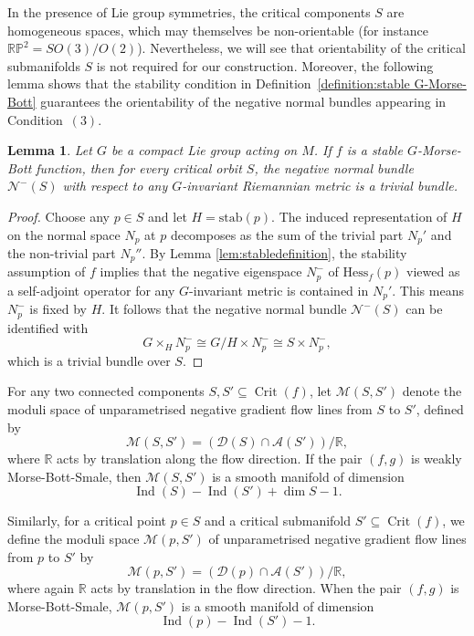 \documentclass[11pt]{amsart}
\newtheorem{lemma}[theorem]{Lemma}
\theoremstyle{definition}
\numberwithin{equation}{subsection}
\newcommand{\R}{\mathbb{R}}
\DeclareMathOperator{\ind}{Ind}
\DeclareMathOperator{\crit}{Crit}
\begin{document}
In the presence of Lie group symmetries, the critical components $S$ are homogeneous spaces, which may themselves be non-orientable (for instance $\mathbb{RP}^2 = SO(3)/O(2)$).
Nevertheless, we will see that orientability of the critical submanifolds $S$ is not required for our construction.
Moreover, the following lemma shows that the stability condition in Definition~\ref{definition:stable G-Morse-Bott} guarantees the orientability of the negative normal bundles appearing in Condition~$(3)$.

\begin{lemma}\label{lem:orientable}
Let $G$ be a compact Lie group acting on $M$.
If $f$ is a stable $G$-Morse-Bott function, then for every critical orbit $S$, the negative normal bundle $\mathcal{N}^-(S)$ with respect to any $G$-invariant Riemannian metric is a trivial bundle.
\end{lemma}

\begin{proof}
    Choose any $p\in S$ and let $H=\text{stab}(p)$. The induced representation of $H$ on the normal space $N_p$ at $p$ decomposes as the sum of the trivial part $N_p'$ and the non-trivial part $N_p''$. By Lemma \ref{lem:stabledefinition}, the stability assumption of $f$ implies that the negative eigenspace $N_p^-$ of $\text{Hess}_f(p)$ viewed as a self-adjoint operator for any $G$-invariant metric is contained in $N_p'$. This means $N_p^-$ is fixed by $H$. It follows that the negative normal bundle $\mathcal{N}^-(S)$ can be identified with \[G\times_H N_p^-\cong G/H\times N_p^-\cong S\times N_p^-,\] which is a trivial bundle over $S$.
\end{proof}



For any two connected components $S,S'\subseteq\crit(f)$, let $\mathcal{M}(S,S')$ denote the moduli space of unparametrised negative gradient flow lines from $S$ to $S'$, defined by
\[
\mathcal{M}(S,S') = (\mathscr{D}(S)\cap \mathscr{A}(S'))/\R,
\]
where $\R$ acts by translation along the flow direction.
If the pair $(f,g)$ is weakly Morse-Bott-Smale, then $\mathcal{M}(S,S')$ is a smooth manifold of dimension
\[
\ind(S)-\ind(S')+\dim S-1.
\]

Similarly, for a critical point $p\in S$ and a critical submanifold $S'\subseteq\crit(f)$, we define the moduli space $\mathcal{M}(p,S')$ of unparametrised negative gradient flow lines from $p$ to $S'$ by
\[
\mathcal{M}(p,S') = (\mathscr{D}(p)\cap \mathscr{A}(S'))/\R,
\]
where again $\R$ acts by translation in the flow direction.
When the pair $(f,g)$ is Morse-Bott-Smale, $\mathcal{M}(p,S')$ is a smooth manifold of dimension
\[
\ind(p)-\ind(S')-1.
\]
\end{document}
